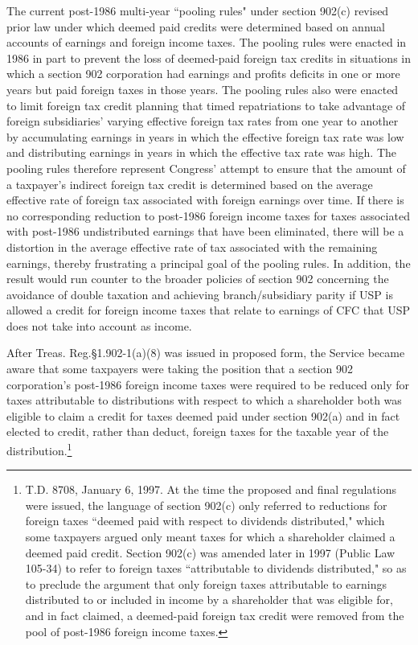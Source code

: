 \begin{select}
The current post-1986 multi-year ``pooling rules" under section 902(c) revised prior law under which deemed paid credits were determined based on annual accounts of earnings and foreign income taxes. The pooling rules were enacted in 1986 in part to prevent the loss of deemed-paid foreign tax credits in situations in which a section 902 corporation had earnings and profits deficits in one or more years but paid foreign taxes in those years. The pooling rules also were enacted to limit foreign tax credit planning that timed repatriations to take advantage of foreign subsidiaries' varying effective foreign tax rates from one year to another by accumulating earnings in years in which the effective foreign tax rate was low and distributing earnings in years in which the effective tax rate was high. The pooling rules therefore represent Congress' attempt to ensure that the amount of a taxpayer's indirect foreign tax credit is determined based on the average effective rate of foreign tax associated with foreign earnings over time. If there is no corresponding reduction to post-1986 foreign income taxes for taxes associated with post-1986 undistributed earnings that have been eliminated, there will be a distortion in the average effective rate of tax associated with the remaining earnings, thereby frustrating a principal goal of the pooling rules. In addition, the result would run counter to the broader policies of section 902 concerning the avoidance of double taxation and achieving branch/subsidiary parity if USP is allowed a credit for foreign income taxes that relate to earnings of CFC that USP does not take into account as income.

After Treas. Reg.\@ \S1.902-1(a)(8) was issued in proposed form, the Service became aware that some taxpayers were taking the position that a section 902 corporation's post-1986 foreign income taxes were required to be reduced only for taxes attributable to distributions with respect to which a shareholder both was eligible to claim a credit for taxes deemed paid under section 902(a) and in fact elected to credit, rather than deduct, foreign taxes for the taxable year of the distribution.\footnote[6]{T.D. 8708, January 6, 1997. At the time the proposed and final regulations were issued, the language of section 902(c) only referred to reductions for foreign taxes ``deemed paid with respect to dividends distributed," which some taxpayers argued only meant taxes for which a shareholder claimed a deemed paid credit. Section 902(c) was amended later in 1997 (Public Law 105-34) to refer to foreign taxes ``attributable to dividends distributed," so as to preclude the argument that only foreign taxes attributable to earnings distributed to or included in income by a shareholder that was eligible for, and in fact claimed, a deemed-paid foreign tax credit were removed from the pool of post-1986 foreign income taxes.} 


\end{select}
